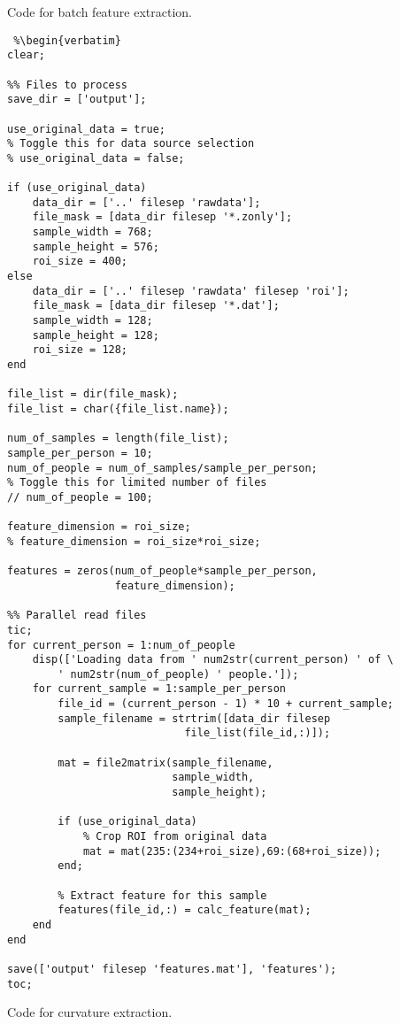 Code for batch feature extraction.

\begin{lstlisting} %\begin{verbatim}
clear;

%% Files to process
save_dir = ['output'];

use_original_data = true;
% Toggle this for data source selection
% use_original_data = false;

if (use_original_data)
    data_dir = ['..' filesep 'rawdata'];
    file_mask = [data_dir filesep '*.zonly'];
    sample_width = 768;
    sample_height = 576;
    roi_size = 400;
else
    data_dir = ['..' filesep 'rawdata' filesep 'roi'];
    file_mask = [data_dir filesep '*.dat'];
    sample_width = 128;
    sample_height = 128;
    roi_size = 128;
end

file_list = dir(file_mask);
file_list = char({file_list.name});

num_of_samples = length(file_list);
sample_per_person = 10;
num_of_people = num_of_samples/sample_per_person;
% Toggle this for limited number of files
// num_of_people = 100;

feature_dimension = roi_size;
% feature_dimension = roi_size*roi_size;

features = zeros(num_of_people*sample_per_person,
                 feature_dimension);

%% Parallel read files
tic;
for current_person = 1:num_of_people
    disp(['Loading data from ' num2str(current_person) ' of \
		' num2str(num_of_people) ' people.']);
    for current_sample = 1:sample_per_person
        file_id = (current_person - 1) * 10 + current_sample;
        sample_filename = strtrim([data_dir filesep
							file_list(file_id,:)]);

        mat = file2matrix(sample_filename,
						  sample_width,
						  sample_height);

        if (use_original_data)
            % Crop ROI from original data
            mat = mat(235:(234+roi_size),69:(68+roi_size));
        end;

        % Extract feature for this sample
        features(file_id,:) = calc_feature(mat);
    end
end

save(['output' filesep 'features.mat'], 'features');
toc;
\end{lstlisting} %
\clearpage

Code for curvature extraction.

